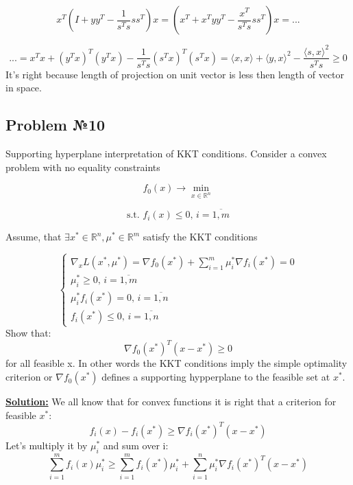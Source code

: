 \begin{equation*}
    x^T(I + yy^T - \frac{1}{s^Ts}ss^T)x = (x^T + x^Tyy^T - \frac{x^T}{s^Ts}ss^T)x = ...
\end{equation*}

\begin{equation*}
    ... = x^Tx + (y^Tx)^T(y^Tx) - \frac{1}{s^Ts} (s^Tx)^T(s^Tx) = \langle x, x \rangle + \langle y, x \rangle^2 - \frac{\langle s, x\rangle^2}{s^Ts} \geq 0
\end{equation*}
It's right because length of projection on unit vector is less then length of vector in space.

\subsection{Problem №10}
Supporting hyperplane interpretation of KKT conditions. Consider a convex problem with no equality constraints

\begin{equation*}
    f_0(x)  \xrightarrow{} \min\limits_{x \in \mathds{R}^n}
\end{equation*}

\begin{equation*}
   \text{s.t. } f_i(x) \leq 0\text{, } i = \overline{1, m}
\end{equation*}

Assume, that $\exists x^* \in \mathds{R}^n, \mu^* \in \mathds{R}^m$ satisfy the KKT conditions

\begin{equation*}
    \begin{cases}
        \nabla_x L(x^*, \mu^*) = \nabla f_0(x^*) + \sum\limits_{i=1}^m \mu_i^* \nabla f_i(x^*) = 0 \\
        \mu_i^* \geq 0\text{, } i = \overline{1, m} \\
        \mu_i^*f_i(x^*) = 0\text{, } i = \overline{1, n} \\
        f_i(x^*) \leq 0 \text{, } i = \overline{1, n}
    \end{cases}
\end{equation*}
Show that:
\begin{equation*}
    \nabla f_0(x^*)^T(x - x^*) \geq 0 
\end{equation*}
for all feasible x. In other words the KKT conditions imply the simple optimality criterion or $\nabla f_0(x^*)$ defines a supporting hypperplane to the feasible set at $x^*$. 

\underline{\textbf{Solution:}}
We all know that for convex functions it is right that a criterion for feasible $x^*$:
\begin{equation*}
    f_i(x) - f_i(x^*) \geq \nabla f_i(x^*)^T(x-x^*) 
\end{equation*}
Let's multiply it by $\mu_i^*$ and sum over i:
\begin{equation*}
    \sum\limits_{i=1}^{m}f_i(x)\mu_i^* \geq \sum\limits_{i=1}^m f_i(x^*)\mu_i^* + \sum\limits_{i=1}^n \mu_i^* \nabla f_i(x^*)^T(x-x^*)
\end{equation*}

